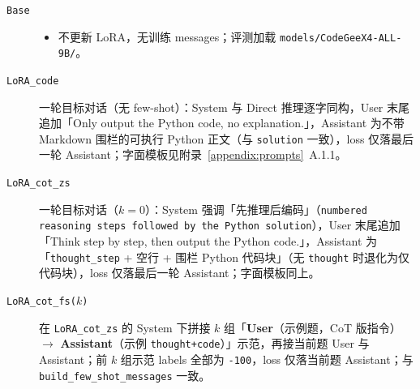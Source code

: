 \begin{description}
  \item[\texttt{Base}]
    \begin{itemize}
        \item 不更新 LoRA，无训练 messages；评测加载 \texttt{models/CodeGeeX4-ALL-9B/}。
    \end{itemize}
  \item[\texttt{LoRA\_code}] 一轮目标对话（无 few-shot）：System 与 Direct 推理逐字同构，User 末尾追加「Only output the Python code, no explanation.」，Assistant 为不带 Markdown 围栏的可执行 Python 正文（与 \texttt{solution} 一致），loss 仅落最后一轮 Assistant；字面模板见附录~\ref{appendix:prompts}~A.1.1。
  \item[\texttt{LoRA\_cot\_zs}] 一轮目标对话（$k{=}0$）：System 强调「先推理后编码」（\texttt{numbered reasoning steps followed by the Python solution}），User 末尾追加「Think step by step, then output the Python code.」，Assistant 为「\texttt{thought\_step} + 空行 + 围栏 Python 代码块」（无 \texttt{thought} 时退化为仅代码块），loss 仅落最后一轮 Assistant；字面模板同上。
  \item[\texttt{LoRA\_cot\_fs($k$)}] 在 \texttt{LoRA\_cot\_zs} 的 System 下拼接 $k$ 组「\textbf{User}（示例题，CoT 版指令）$\rightarrow$ \textbf{Assistant}（示例 \texttt{thought+code}）」示范，再接当前题 User 与 Assistant；前 $k$ 组示范 labels 全部为 \texttt{-100}，loss 仅落当前题 Assistant；与 \texttt{build\_few\_shot\_messages} 一致。
\end{description}

